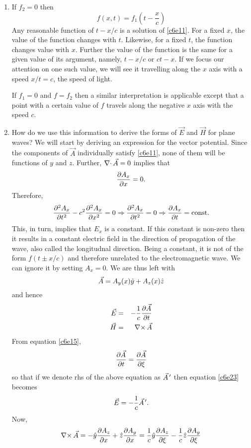 \begin{enumerate}
\item If $f_2 = 0$ then
\[
f(x, t) = f_1\left(t - \frac{x}{c}\right)
\]
Any reasonable function of $t - x/c$ is a solution of \eqref{c6e11}. For a fixed
$x$, the value of the function changes with $t$. Likewise, for a fixed $t$, the
function changes value with $x$. Further the value of the function is the same
for a given value of its argument, namely, $t - x/c$ or $ct - x$. If we focus 
our attention on one such value, we will see it travelling along the $x$ axis 
with a speed $x/t = c$, the speed of light.

If $f_1 = 0$ and $f = f_2$ then a similar interpretation is applicable except
that a point with a certain value of $f$ travels along the negative $x$ axis
with the speed $c$.

\item How do we use this information to derive the forms of $\vec{E}$ and 
$\vec{H}$ for plane waves? We will start by deriving an expression for the vector
potential. Since the components of $\vec{A}$ individually satisfy \eqref{c6e11}, 
none of them will be functions of $y$ and $z$. Further, $\operatorname{\nabla\cdot}\vec{A} = 0$ 
implies that
\[
\frac{\partial{A_x}}{\partial{x}} = 0.
\]
Therefore,
\[
\frac{\partial^2{A_x}}{\partial{t}^2} - c^2\frac{\partial^2{A_x}}{\partial{x}^2} = 0 \Rightarrow \frac{\partial^2{A_x}}{\partial{t}^2} = 0
\Rightarrow \frac{\partial{A_x}}{\partial{t}} = \text{const.}
\]
This, in turn, implies that $E_x$ is a constant. If this constant is non-zero
then it results in a constant electric field in the direction of propagation
of the wave, also called the longitudnal direction. Being a constant, it is
not of the form $f(t \pm x/c)$ and therefore unrelated to the electromagnetic
wave. We can ignore it by setting $A_x = 0$. We are thus left with
\begin{equation}\label{c6e22}
\vec{A} = A_y(x)\hat{y} + A_z(x)\hat{z}
\end{equation}
and hence
\begin{eqnarray}
\vec{E} &=& -\frac{1}{c}\frac{\partial{\vec{A}}}{\partial{t}} \label{c6e23} \\
\vec{H} &=& \operatorname{\nabla\times}\vec{A} \label{c6e24}
\end{eqnarray}
From equation \eqref{c6e15},
\[
\frac{\partial{\vec{A}}}{\partial{t}} = \frac{\partial{\vec{A}}}{\partial{\xi}}
\]
so that if we denote rhs of the above equation as $\vec{A}^{\,\prime}$ then equation 
\eqref{c6e23} becomes
\begin{equation}\label{c6e25}
\vec{E} = -\frac{1}{c}\vec{A}^{\,\prime}.
\end{equation}
Now,
\begin{equation}\label{c6e26}
\curl\vec{A} = -\uv{y}\pdt{A_z}{x} + \uv{z}\pdt{A_y}{x} = 
\frac{1}{c}\uv{y}\pdt{A_z}{\xi} - \frac{1}{c}\uv{z}\pdt{A_y}{\xi}

\end{equation}
\end{enumerate}
